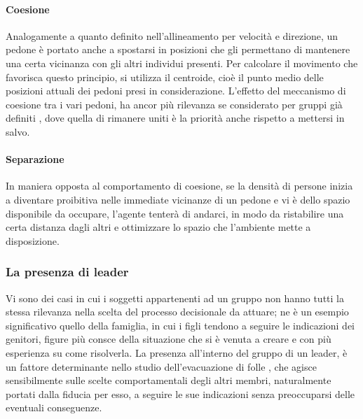 \paragraph{Coesione}
Analogamente a quanto definito nell'allineamento per velocità e direzione, un pedone è portato anche a spostarsi in posizioni che gli permettano di mantenere una certa vicinanza con gli altri individui presenti. Per calcolare il movimento che favorisca questo principio, si utilizza il centroide, cioè il punto medio delle posizioni attuali dei pedoni presi in considerazione. \newline
L'effetto del meccanismo di coesione tra i vari pedoni, ha ancor più rilevanza se considerato per gruppi già definiti \cite{Vizzari2013}, dove quella di rimanere uniti è la priorità anche rispetto a mettersi in salvo.

\paragraph{Separazione}
In maniera opposta al comportamento di coesione, se la densità di persone inizia a diventare proibitiva nelle immediate vicinanze di un pedone e vi è dello spazio disponibile da occupare, l'agente tenterà di andarci, in modo da ristabilire una certa distanza dagli altri e ottimizzare lo spazio che l'ambiente mette a disposizione.

\subsubsection{La presenza di leader}
Vi sono dei casi in cui i soggetti appartenenti ad un gruppo non hanno tutti la stessa rilevanza nella scelta del processo decisionale da attuare; ne è un esempio significativo quello della famiglia, in cui i figli tendono a seguire le indicazioni dei genitori, figure più consce della situazione che si è venuta a creare e con più esperienza su come risolverla. \newline
La presenza all'interno del gruppo di un leader, è un fattore determinante nello studio dell'evacuazione di folle \cite{Ji2006}\cite{Kster2011}, che agisce sensibilmente sulle scelte comportamentali degli altri membri, naturalmente portati dalla fiducia per esso, a seguire le sue indicazioni senza preoccuparsi delle eventuali conseguenze.